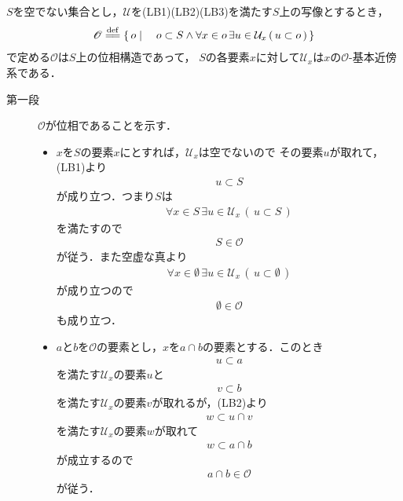 	\begin{screen}
		\begin{thm}[与えられたシステムを基本近傍系とする位相の生成]
		\label{thm:a_local_base_restores_the_topology}
			$S$を空でない集合とし，$\mathcal{U}$を(LB1)(LB2)(LB3)を満たす$S$上の写像とするとき，
			\begin{align}
				\mathscr{O} \defeq
				\Set{o}{o \subset S \wedge \forall x \in o\, \exists u \in \mathcal{U}_{x}\, (\, u \subset o\, )}
			\end{align}
			で定める$\mathscr{O}$は$S$上の位相構造であって，
			$S$の各要素$x$に対して$\mathcal{U}_{x}$は$x$の$\mathscr{O}$-基本近傍系である．
		\end{thm}
	\end{screen}
	
	\begin{prf}\mbox{}
		\begin{description}
			\item[第一段]
				$\mathscr{O}$が位相であることを示す．
				\begin{itemize}
					\item $x$を$S$の要素$x$にとすれば，$\mathcal{U}_{x}$は空でないので
						その要素$u$が取れて，(LB1)より
						\begin{align}
							u \subset S
						\end{align}
						が成り立つ．つまり$S$は
						\begin{align}
							\forall x \in S\, \exists u \in \mathcal{U}_{x}\, (\, u \subset S\, )
						\end{align}
						を満たすので
						\begin{align}
							S \in \mathscr{O}
						\end{align}
						が従う．また空虚な真より
						\begin{align}
							\forall x \in \emptyset\, \exists u \in \mathcal{U}_{x}\, (\, u \subset \emptyset\, )
						\end{align}
						が成り立つので
						\begin{align}
							\emptyset \in \mathscr{O}
						\end{align}
						も成り立つ．
						
					\item $a$と$b$を$\mathscr{O}$の要素とし，$x$を$a \cap b$の要素とする．このとき
						\begin{align}
							u \subset a
						\end{align}
						を満たす$\mathcal{U}_{x}$の要素$u$と
						\begin{align}
							v \subset b
						\end{align}
						を満たす$\mathcal{U}_{x}$の要素$v$が取れるが，(LB2)より
						\begin{align}
							w \subset u \cap v
						\end{align}
						を満たす$\mathcal{U}_{x}$の要素$w$が取れて
						\begin{align}
							w \subset a \cap b
						\end{align}
						が成立するので
						\begin{align}
							a \cap b \in \mathscr{O}
						\end{align}
						が従う．
						

\end{itemize}
\end{description}
\end{prf}
